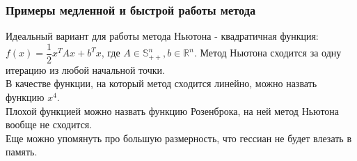 \subsubsection{Примеры медленной и быстрой работы метода}
Идеальный вариант для работы метода Ньютона - квадратичная функция: $f(x) = \dfrac{1}{2} x^T A x + b^T x$, где $A \in \mathbb{S}^{n}_{++}, b \in \mathbb{R}^{n}$. Метод Ньютона сходится за одну итерацию из любой начальной точки. \\
В качестве функции, на который метод сходится линейно, можно назвать функцию $x^4$. \\
Плохой функцией можно назвать функцию Розенброка, на ней метод Ньютона вообще не сходится. \\
Еще можно упомянуть про большую размерность, что гессиан не будет влезать в память.